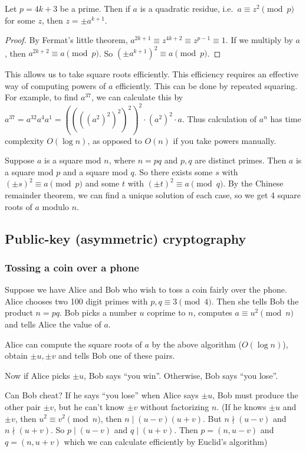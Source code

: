 \documentclass[a4paper]{article}
\begin{document}
\begin{prop}
  Let $p = 4k + 3$ be a prime. Then if $a$ is a quadratic residue, i.e.\ $a \equiv z^2 \pmod p$ for some $z$, then $z = \pm a^{k + 1}$.
\end{prop}

\begin{proof}
  By Fermat's little theorem, $a^{2k + 1} \equiv z^{4k + 2} \equiv z^{p - 1} \equiv 1$. If we multiply by $a$, then $a^{2k + 2} \equiv a \pmod p$. So $(\pm a^{k + 1})^2 \equiv a \pmod p$.
\end{proof}
This allows us to take square roots efficiently. This efficiency requires an effective way of computing powers of $a$ efficiently. This can be done by repeated squaring. For example, to find $a^{37}$, we can calculate this by $a^{37} = a^{32}a^4a^1 = ((((a^2)^2)^2)^2)^2 \cdot (a^2)^2\cdot a$. Thus calculation of $a^n$ has time complexity $O(\log n)$, as opposed to $O(n)$ if you take powers manually.

Suppose $a$ is a square mod $n$, where $n = pq$ and $p, q$ are distinct primes. Then $a$ is a square mod $p$ and a square mod $q$. So there exists some $s$ with $(\pm s)^2 \equiv a\pmod p$ and some $t$ with $(\pm t)^2\equiv a\pmod q$. By the Chinese remainder theorem, we can find a unique solution of each case, so we get 4 square roots of $a$ modulo $n$.

\subsection{Public-key (asymmetric) cryptography}
\subsubsection*{Tossing a coin over a phone}
Suppose we have Alice and Bob who wish to toss a coin fairly over the phone. Alice chooses two 100 digit primes with $p, q\equiv 3\pmod 4$. Then she tells Bob the product $n = pq$. Bob picks a number $u$ coprime to $n$, computes $a\equiv u^2\pmod n$ and tells Alice the value of $a$.

Alice can compute the square roots of $a$ by the above algorithm ($O(\log n)$), obtain $\pm u, \pm v$ and tells Bob one of these pairs.

Now if Alice picks $\pm u$, Bob says ``you win''. Otherwise, Bob says ``you lose''.

Can Bob cheat? If he says ``you lose'' when Alice says $\pm u$, Bob must produce the other pair $\pm v$, but he can't know $\pm v$ without factorizing $n$. (If he knows $\pm u$ and $\pm v$, then $u^2 \equiv v^2\pmod n$, then $n \mid (u - v)(u + v)$. But $n\nmid (u - v)$ and $n\nmid (u + v)$. So $p \mid (u - v)$ and $q \mid (u + v)$. Then $p = (n, u - v)$ and $q = (n, u + v)$ which we can calculate efficiently by Euclid's algorithm)
\end{document}
